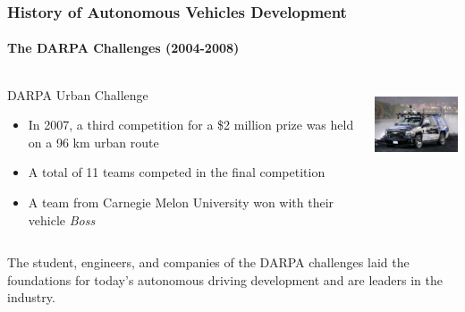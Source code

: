 \begin{frame}
\frametitle{History of Autonomous Vehicles Development}
\framesubtitle{The DARPA Challenges (2004-2008)}
\begin{columns}[T]
    \begin{column}{.7\textwidth}
    DARPA Urban Challenge\footnotemark[1]
    \begin{itemize}
        \item In 2007, a third competition for a \$2 million prize was held on
            a 96 km urban route
        \item A total of 11 teams competed in the final competition
        \item A team from Carnegie Melon University won with their vehicle
            \emph{Boss}
    \end{itemize}
    \end{column}
    \begin{column}{.3\textwidth}
    \centering
    \includegraphics[height=2.25cm]{images/darpa_boss.jpg} \\
    \tiny{\cite{CMUUrbanChallenge}}
    \end{column}
\end{columns}
\pause
\vspace{0.25cm}
\begin{block}{}
The student, engineers, and companies of the DARPA challenges laid the
foundations for today's autonomous driving development and are leaders in the
industry.
\end{block}
\end{frame}

